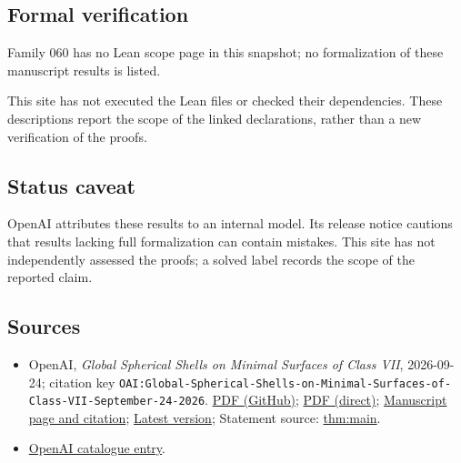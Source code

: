 \documentclass[11pt]{article}
\begin{document}
\subsection{Formal verification}
Family 060 has no Lean scope page in this snapshot; no formalization of these manuscript results is listed.

This site has not executed the Lean files or checked their dependencies. These descriptions report the scope of the linked declarations, rather than a new verification of the proofs.

\subsection{Status caveat}
OpenAI attributes these results to an internal model. Its release notice cautions that results lacking full formalization can contain mistakes. This site has not independently assessed the proofs; a solved label records the scope of the reported claim.

\subsection{Sources}
\begin{itemize}
\item OpenAI, \emph{Global Spherical Shells on Minimal Surfaces of Class VII}, 2026-09-24; citation key \texttt{OAI:Global-Spherical-Shells-on-Minimal-Surfaces-of-Class-VII-September-24-2026}. \href{https://github.com/openai/math/blob/adc7f1241b42e322a6451854ab7e4b4c146bf78a/preprints/Global-Spherical-Shells-on-Minimal-Surfaces-of-Class-VII-September-24-2026/paper.pdf}{PDF (GitHub)}; \href{https://github.com/openai/math/raw/adc7f1241b42e322a6451854ab7e4b4c146bf78a/preprints/Global-Spherical-Shells-on-Minimal-Surfaces-of-Class-VII-September-24-2026/paper.pdf}{PDF (direct)}; \href{https://github.com/openai/math/blob/adc7f1241b42e322a6451854ab7e4b4c146bf78a/preprints/Global-Spherical-Shells-on-Minimal-Surfaces-of-Class-VII-September-24-2026/README.md}{Manuscript page and citation}; \href{https://github.com/openai/math/blob/main/preprints/Global-Spherical-Shells-on-Minimal-Surfaces-of-Class-VII-September-24-2026/paper.pdf}{Latest version}; Statement source: \href{https://github.com/openai/math/blob/adc7f1241b42e322a6451854ab7e4b4c146bf78a/preprints/Global-Spherical-Shells-on-Minimal-Surfaces-of-Class-VII-September-24-2026/build/paper.tex\#L102}{thm:main}.
\item \href{https://github.com/openai/math/blob/adc7f1241b42e322a6451854ab7e4b4c146bf78a/CONTENTS.md}{OpenAI catalogue entry}.
\end{itemize}
\end{document}
